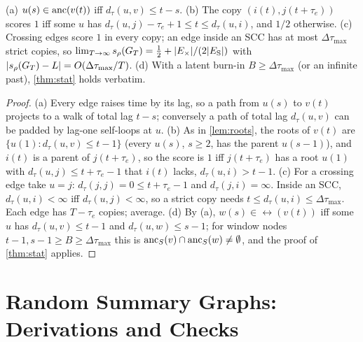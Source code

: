 \begin{proposition}\label{prop:lags}
(a) $u(s)\in\mathrm{anc}(v(t))$ iff $d_\tau(u,v)\le t-s$. (b) The copy
$(i(t),j(t{+}\tau_e))$ scores $1$ iff some $u$ has
$d_\tau(u,j)-\tau_e+1\le t\le d_\tau(u,i)$, and $1/2$ otherwise. (c) Crossing
edges score $1$ in every copy; an edge inside an SCC has at most
$\Delta\tau_{\max}$ strict copies, so
$\lim_{T\to\infty}s_\rho(G_T)=\tfrac12+|E_{\times}|/(2|E_{\mathrm S}|)$ with $|s_\rho(G_T)-L|=O(\Delta\tau_{\max}/T)$.
(d) With a latent burn-in $B\ge\Delta\tau_{\max}$ (or an infinite past),
\cref{thm:stat} holds verbatim.
\end{proposition}
\begin{proof}
(a) Every edge raises time by its lag, so a path from $u(s)$ to $v(t)$ projects
to a walk of total lag $t-s$; conversely a path of total lag $d_\tau(u,v)$ can be
padded by lag-one self-loops at $u$. (b) As in \cref{lem:roots}, the roots of
$v(t)$ are $\{u(1):d_\tau(u,v)\le t-1\}$ (every $u(s)$, $s\ge2$, has the parent
$u(s-1)$), and $i(t)$ is a parent of $j(t{+}\tau_e)$, so the score is $1$ iff
$j(t{+}\tau_e)$ has a root $u(1)$ with $d_\tau(u,j)\le t+\tau_e-1$ that $i(t)$
lacks, $d_\tau(u,i)>t-1$. (c) For a crossing edge take $u=j$:
$d_\tau(j,j)=0\le t+\tau_e-1$ and $d_\tau(j,i)=\infty$. Inside an SCC,
$d_\tau(u,i)<\infty$ iff $d_\tau(u,j)<\infty$, so a strict copy needs
$t\le d_\tau(u,i)\le\Delta\tau_{\max}$. Each edge has $T-\tau_e$ copies; average.
(d) By (a), $w(s)\in\rel(v(t))$ iff some $u$ has $d_\tau(u,v)\le t-1$ and
$d_\tau(u,w)\le s-1$; for window nodes $t-1,s-1\ge B\ge\Delta\tau_{\max}$ this is
$\mathrm{anc}_S(v)\cap\mathrm{anc}_S(w)\ne\emptyset$, and the proof of \cref{thm:stat} applies.
\end{proof}

\section{Random Summary Graphs: Derivations and Checks}
\label{app:er}

